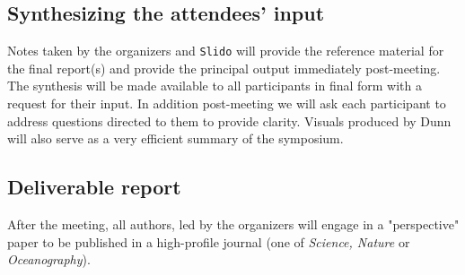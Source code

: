  
\subsection{Synthesizing the attendees’ input}

Notes taken by the organizers and \texttt{Slido} will provide the
reference material for the final report(s) and provide the principal
output immediately post-meeting. The synthesis will be made available to
all participants in final form with a request for their input. In
addition post-meeting we will ask each participant to address questions
directed to them to provide clarity. Visuals produced by Dunn will also
serve as a very efficient summary of the symposium.

 
\subsection{Deliverable report}

After the meeting, all authors, led by the organizers will engage in a
"perspective" paper to be published in a high-profile journal (one of
\emph{Science, Nature} or \emph{Oceanography}).

